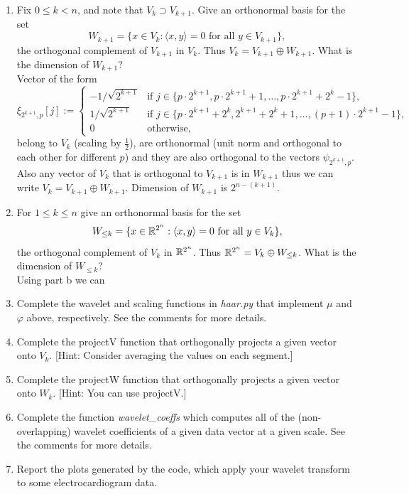 \documentclass[12pt,twoside]{article}
\begin{document}
\begin{enumerate}
\begin{enumerate}
  \item Fix $0\leq k < n$, and note that $V_k\supset V_{k+1}$.  Give an orthonormal basis for
    the set
    $$W_{k+1}=\{x\in V_k : \text{$\langle x,y\rangle = 0$ for all
      $y\in V_{k+1}$}\},$$
    the orthogonal complement of $V_{k+1}$ in $V_k$.  Thus
    $V_k=V_{k+1}\oplus W_{k+1}$. What is the
    dimension of $W_{k+1}$?\\
    
    Vector of the form 
    $$\xi_{2^{k+1},p}[j] :=
  \begin{cases}
    -1/\sqrt{2^{k+1}} & \text{if $j\in\{p\cdot 2^{k+1},p\cdot 2^{k+1}+1,\ldots,p\cdot 2^{k+1}+2^{k}-1\}$,}\\
    1/\sqrt{2^{k+1}} & \text{if $j\in\{p\cdot 2^{k+1}+2^{k},2^{k+1}+2^{k}+1,\ldots,(p+1)\cdot2^{{k+1}}-1\}$,}\\
    0 & \text{otherwise,}
  \end{cases}
  $$
  belong to $V_k$ (scaling by $\frac{1}{2}$), are orthonormal (unit norm and orthogonal to each other for different $p$) and they are also orthogonal to the vectors
  $\psi_{2^{k+1},p}$. Also any vector of $V_k$ that is orthogonal to  $V_{k+1}$  is in $W_{k+1}$ thus we can write
  $V_k=V_{k+1}\oplus W_{k+1}$.
  Dimension of  $W_{k+1}$ is $2^{n-(k+1)}$.


  \item For $1\leq k\leq n$ give an orthonormal basis for the set
    $$W_{\leq k}=\{x\in \mathbb{R}^{2^n} : \text{$\langle x,y\rangle = 0$ for all
      $y\in V_{k}$}\},$$
    the orthogonal complement of $V_{k}$ in $\mathbb{R}^{2^n}$.  Thus
    $\mathbb{R}^{2^n}=V_{k}\oplus W_{\leq k}$. What is the
    dimension of $W_{\leq k}$?\\
    Using part b we can 
    
  \item Complete the wavelet and scaling functions in \emph{haar.py} that implement $\mu$
    and $\varphi$ above, respectively.  See the comments for more
    details.
  \item Complete the projectV function that orthogonally projects a
    given vector onto $V_k$. [Hint: Consider averaging the values on each segment.]
  \item Complete the projectW function that orthogonally projects a
    given vector onto $W_k$. [Hint: You can use projectV.]
  \item Complete the function \emph{wavelet\_coeffs}
    which computes all of the (non-overlapping) wavelet 
    coefficients of a given data vector at a given scale.  
    See the comments for more details.
    \item Report the plots generated by the code, which apply your wavelet transform to some electrocardiogram data.
    

\end{enumerate}
\end{enumerate}
\end{document}
